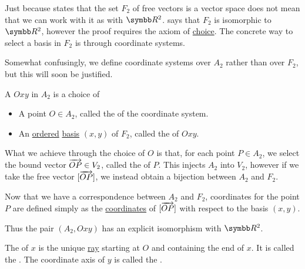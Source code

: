 \begin{definition}\label{def:euclidean_plane_coordinate_system}
  Just because  states that the set \( F_2 \) of free vectors is a vector space does not mean that we can work with it as with \( \BR^2 \).  says that \( F_2 \) is isomorphic to \( \BR^2 \), however the proof requires the axiom of \hyperref[def:set_zfc/A9]{choice}. The concrete way to select a basis in \( F_2 \) is through coordinate systems.

  Somewhat confusingly, we define coordinate systems over \( A_2 \) rather than over \( F_2 \), but this will soon be justified.

  A  \( Oxy \) in \( A_2 \) is a choice of
  \begin{itemize}
    \item A point \( O \in A_2 \), called the  of the coordinate system.
    \item An \hyperref[def:poset]{ordered} \hyperref[def:left_module_hamel_basis]{basis} \( (x, y) \) of \( F_2 \), called the  of \( Oxy \).
  \end{itemize}

  What we achieve through the choice of \( O \) is that, for each point \( P \in A_2 \), we select the bound vector \( \overrightarrow{OP} \in V_2 \), called the  of \( P \). This injects \( A_2 \) into \( V_2 \), however if we take the free vector \( [\overrightarrow{OP}] \), we instead obtain a bijection between \( A_2 \) and \( F_2 \).

  Now that we have a correspondence between \( A_2 \) and \( F_2 \), coordinates for the point \( P \) are defined simply as the \hyperref[def:left_module_basis_projection]{coordinates} of \( [\overrightarrow{OP}] \) with respect to the basis \( (x, y) \).

  Thus the pair \( (A_2, Oxy) \) has an explicit isomorphism with \( \BR^2 \).

  The  of \( x \) is the unique \hyperref[def:affine_plane/ray]{ray} starting at \( O \) and containing the end of \( x \). It is called the . The coordinate axis of \( y \) is called the .
\end{definition}

